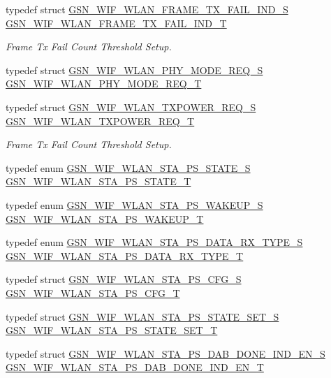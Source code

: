 \begin{DoxyCompactItemize}
typedef struct \hyperlink{a00382}{GSN\_\-WIF\_\-WLAN\_\-FRAME\_\-TX\_\-FAIL\_\-IND\_\-S} \hyperlink{a00677_ga72cc751c5634b432dbd748e5760ba9c3}{GSN\_\-WIF\_\-WLAN\_\-FRAME\_\-TX\_\-FAIL\_\-IND\_\-T}
\begin{DoxyCompactList}\small\item\em Frame Tx Fail Count Threshold Setup. \end{DoxyCompactList}\item 
typedef struct \hyperlink{a00393}{GSN\_\-WIF\_\-WLAN\_\-PHY\_\-MODE\_\-REQ\_\-S} \hyperlink{a00677_gad732cb7dd018272c31146ba48ee6e657}{GSN\_\-WIF\_\-WLAN\_\-PHY\_\-MODE\_\-REQ\_\-T}
\item 
typedef struct \hyperlink{a00411}{GSN\_\-WIF\_\-WLAN\_\-TXPOWER\_\-REQ\_\-S} \hyperlink{a00677_ga23625516479d19d7b54f0771fdacec4a}{GSN\_\-WIF\_\-WLAN\_\-TXPOWER\_\-REQ\_\-T}
\begin{DoxyCompactList}\small\item\em Frame Tx Fail Count Threshold Setup. \end{DoxyCompactList}\item 
typedef enum \hyperlink{a00677_gacdd46642c1bc32323d14e63794ffc1b3}{GSN\_\-WIF\_\-WLAN\_\-STA\_\-PS\_\-STATE\_\-S} \hyperlink{a00677_gaa2a092592d015a1963ac4736c11084d5}{GSN\_\-WIF\_\-WLAN\_\-STA\_\-PS\_\-STATE\_\-T}
\item 
typedef enum \hyperlink{a00677_ga37d0f17a3334d0645a337ca71c7c9bcb}{GSN\_\-WIF\_\-WLAN\_\-STA\_\-PS\_\-WAKEUP\_\-S} \hyperlink{a00677_ga87b10edb516da9c03dd06234ee6d7fd5}{GSN\_\-WIF\_\-WLAN\_\-STA\_\-PS\_\-WAKEUP\_\-T}
\item 
typedef enum \hyperlink{a00677_ga28466fa12055a0a4209a8280d845b52e}{GSN\_\-WIF\_\-WLAN\_\-STA\_\-PS\_\-DATA\_\-RX\_\-TYPE\_\-S} \hyperlink{a00677_ga7e3a091c3528831ca0870a266e284513}{GSN\_\-WIF\_\-WLAN\_\-STA\_\-PS\_\-DATA\_\-RX\_\-TYPE\_\-T}
\item 
typedef struct \hyperlink{a00403}{GSN\_\-WIF\_\-WLAN\_\-STA\_\-PS\_\-CFG\_\-S} \hyperlink{a00677_gabf94d7933715cf79cb8890c7204e13d9}{GSN\_\-WIF\_\-WLAN\_\-STA\_\-PS\_\-CFG\_\-T}
\item 
typedef struct \hyperlink{a00405}{GSN\_\-WIF\_\-WLAN\_\-STA\_\-PS\_\-STATE\_\-SET\_\-S} \hyperlink{a00677_ga5aa8c0c0f00f05050a28edaeac02c38f}{GSN\_\-WIF\_\-WLAN\_\-STA\_\-PS\_\-STATE\_\-SET\_\-T}
\item 
typedef struct \hyperlink{a00404}{GSN\_\-WIF\_\-WLAN\_\-STA\_\-PS\_\-DAB\_\-DONE\_\-IND\_\-EN\_\-S} \hyperlink{a00677_ga1cf71e203d0c95dd43cfcdfea736733c}{GSN\_\-WIF\_\-WLAN\_\-STA\_\-PS\_\-DAB\_\-DONE\_\-IND\_\-EN\_\-T}

\end{DoxyCompactItemize}
